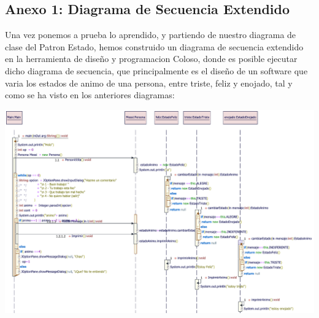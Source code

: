 \subsection{Anexo 1: Diagrama de Secuencia Extendido}
\begin{flushleft}
	Una vez ponemos a prueba lo aprendido, y partiendo de nuestro diagrama de clase del Patron Estado, hemos construido un diagrama de secuencia extendido en la herramienta de diseño y programacion Coloso, donde es posible ejecutar dicho diagrama de secuencia, que principalmente es el diseño de un software que varia los estados de animo de una persona, entre triste, feliz y enojado, tal y como se ha visto en los anteriores diagramas:
	\begin{center}
		{\includegraphics[width=1.28\linewidth]{imgs/Imagenes - Diagrama de estados/Anexo 1/diagramasecuencia}}\end{center}
\end{flushleft}


